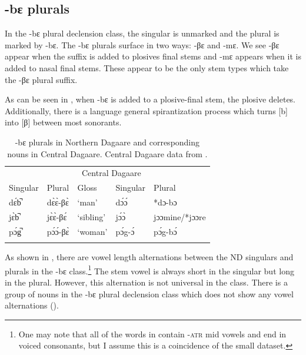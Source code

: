 \documentclass[output=paper,colorlinks,citecolor=brown,
]{langscibook}
\begin{document}
\subsection{-bɛ plurals} \label{sec:Caragine:bePl}

In the -bɛ plural declension class, the singular is unmarked and the plural is marked by -bɛ. The -bɛ plurals surface in two ways: -βɛ and -mɛ. We see -βɛ appear when the suffix is added to plosives final stems and -mɛ appears when it is added to nasal final stems. These appear to be the only stem types which take the -βɛ plural suffix.

As can be seen in , when -bɛ is added to a plosive-final stem, the plosive deletes. Additionally, there is a language general spirantization process which turns [b] into [β] between most sonorants. 

\begin{table}

  \caption{-bɛ plurals in Northern Dagaare and corresponding nouns in Central Dagaare. Central Dagaare data from \citet{aliDictionary2021}.}
  \label{tab:Caragine:bePluralsCons}
  
\begin{tabular}{lllll}
\lsptoprule 
\multicolumn{2}{c}{Northern Dagaare} & \multicolumn{1}{c}{}& \multicolumn{2}{c}{Central Dagaare}\\
Singular & Plural & Gloss 
& Singular & Plural \\
\midrule\midrule
dɛ́b̚ & dɛ̀ɛ̀-βɛ̀ & `man' &dɔ́ɔ́& *dɔ-bɔ\\
jɛ̀b̚ & jɛ̀ɛ̀-βɛ́ & `sibling' &jɔ́ɔ̀& jɔɔmine/*jɔɔre\\
pɔ́g̚ & pɔ́ɔ́-βɛ̀ & `woman' & pɔ́g-ɔ́ & pɔ́g-bɔ́\\
\lspbottomrule 

\end{tabular}
\end{table}

As shown in , there are vowel length alternations between the ND singulars and plurals in the -bɛ class.\footnote{One may note that all of the words in  contain -\textsc{atr} mid vowels and end in voiced consonants, but I assume this is a coincidence of the small dataset.} The stem vowel is always short in the singular but long in the plural. However, this alternation is not universal in the class. There is a group of nouns in the -bɛ plural declension class which does not show any vowel alternations ().
\end{document}

